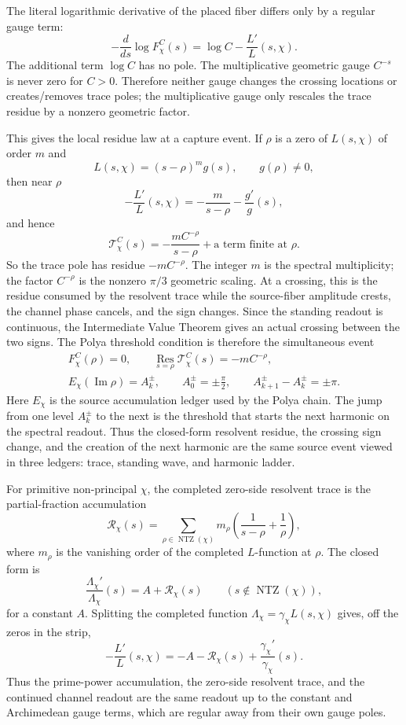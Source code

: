 \documentclass[11pt]{article}
\DeclareMathOperator{\Imm}{Im}
\DeclareMathOperator{\NTZ}{NTZ}
\begin{document}
The literal logarithmic derivative of the placed fiber differs only by a
regular gauge term:
\[
  -\frac{d}{ds}\log F_\chi^C(s)
  =
  \log C-\frac{L'}{L}(s,\chi).
\]
The additional term $\log C$ has no pole.  The multiplicative geometric gauge
$C^{-s}$ is never zero for $C>0$.  Therefore neither gauge changes the crossing
locations or creates/removes trace poles; the multiplicative gauge only rescales
the trace residue by a nonzero geometric factor.

This gives the local residue law at a capture event.  If $\rho$ is a zero of
$L(s,\chi)$ of order $m$ and
\[
  L(s,\chi)=(s-\rho)^m g(s),\qquad g(\rho)\ne0,
\]
then near $\rho$
\[
  -\frac{L'}{L}(s,\chi)
  =
  -\frac{m}{s-\rho}-\frac{g'}{g}(s),
\]
and hence
\[
  \mathcal T_\chi^C(s)
  =
  -\frac{mC^{-\rho}}{s-\rho}
  +\text{a term finite at }\rho .
\]
So the trace pole has residue $-mC^{-\rho}$.  The integer $m$ is the spectral
multiplicity; the factor $C^{-\rho}$ is the nonzero $\pi/3$ geometric scaling.
At a crossing, this is the residue consumed by the resolvent trace while the
source-fiber amplitude crests, the channel phase cancels, and the
sign changes.
Since the standing readout is continuous, the Intermediate Value Theorem gives
an actual crossing between the two signs.
The Polya threshold condition is therefore the simultaneous event
\[
\begin{gathered}
  F_\chi^C(\rho)=0,\qquad
  \operatorname*{Res}_{s=\rho}\mathcal T_\chi^C(s)=-mC^{-\rho},\\
  E_\chi(\Imm\rho)=A_k^\pm,
  \qquad
  A_0^\pm=\pm\frac{\pi}{2},\qquad
  A_{k+1}^\pm-A_k^\pm=\pm\pi .
\end{gathered}
\]
Here $E_\chi$ is the source accumulation ledger used by the Polya chain.  The
jump from one level $A_k^\pm$ to the next is the threshold that starts the next
harmonic on the spectral readout.  Thus the closed-form resolvent residue, the
crossing sign change, and the creation of the next harmonic are the same source
event viewed in three ledgers: trace, standing wave, and harmonic ladder.

For primitive non-principal $\chi$, the completed zero-side resolvent trace is
the partial-fraction accumulation
\[
  \mathcal R_\chi(s)
  =
  \sum_{\rho\in\NTZ(\chi)}
    m_\rho
    \left(\frac{1}{s-\rho}+\frac{1}{\rho}\right),
\]
where $m_\rho$ is the vanishing order of the completed $L$-function at $\rho$.
The closed form is
\[
  \frac{\Lambda_\chi'}{\Lambda_\chi}(s)
  =
  A+\mathcal R_\chi(s)
  \qquad (s\notin\NTZ(\chi)),
\]
for a constant $A$.  Splitting the completed function
$\Lambda_\chi=\gamma_\chi L(s,\chi)$ gives, off the zeros in the strip,
\[
  -\frac{L'}{L}(s,\chi)
  =
  -A-\mathcal R_\chi(s)+\frac{\gamma_\chi'}{\gamma_\chi}(s).
\]
Thus the prime-power accumulation, the zero-side resolvent trace, and the
continued channel readout are the same readout up to the constant and
Archimedean gauge terms, which are regular away from their own gauge poles.
\end{document}
